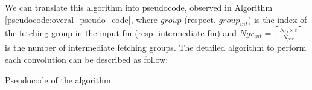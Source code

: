 We can translate this algorithm into pseudocode, observed in Algorithm \ref{pseudocode:overal_pseudo_code}, where $group$ (respect. $group_{int}$) is the index of the fetching group in the input \acrshort{fm} (resp. intermediate \acrshort{fm}) and $Ngr_{int} = \left\lceil \frac{N_{if} \times t}{N_{par}} \right\rceil$ is the number of intermediate fetching groups. The detailed algorithm to perform each convolution can be described as follow:
\begin{algorithm}[H]
    \centering
    \begin{algorithmic}
        \EndFor
    \end{algorithmic}
    \caption{Pseudocode of the algorithm}
    \label{pseudocode:overal_pseudo_code}
\end{algorithm}
%
